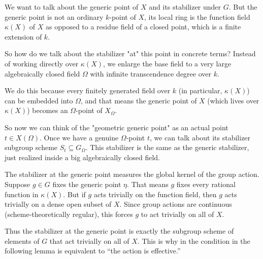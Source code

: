 \documentclass[12pt]{article}
\begin{document}
\begin{remark}
     We want to talk about the generic point of $X$ and its stabilizer under $G$. But the generic point is not an ordinary $k$-point of $X$, its local ring is the function field $\kappa(X)$ of $X$ as opposed to a residue field of a closed point, which is a finite extension of $k$. 

    So how do we talk about the stabilizer "at" this point in concrete terms? Instead of working directly over $\kappa(X)$, we enlarge the base field to a very large algebraically closed field $\Omega$ with infinite transcendence degree over $k$.

    We do this because every finitely generated field over $k$ (in particular, $\kappa(X)$) can be embedded into $\Omega$, and that means the generic point of $X$ (which lives over $\kappa(X)$) becomes an $\Omega$-point of $X_\Omega$.

    So now we can think of the "geometric generic point" as an actual point $t \in X(\Omega)$. Once we have a genuine $\Omega$-point $t$, we can talk about its stabilizer subgroup scheme $S_t \subseteq G_\Omega$. This stabilizer is the same as the generic stabilizer, just realized inside a big algebraically closed field.

The stabilizer at the generic point measures the global kernel of the group action. Suppose $g \in G$ fixes the generic point $\eta$. That means $g$ fixes every rational function in $\kappa(X)$. But if $g$ acts trivially on the function field, then $g$ acts trivially on a dense open subset of $X$. Since group actions are continuous (scheme-theoretically regular), this forces $g$ to act trivially on all of $X$.

Thus the stabilizer at the generic point is exactly the subgroup scheme of elements of $G$ that act trivially on all of $X$.
This is why in the condition in the following lemma is equivalent to “the action is effective.”
\end{remark}
\end{document}
